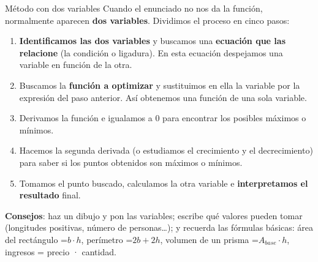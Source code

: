 \documentclass[11pt,a4paper]{article}
\newcommand{\fmm}[1]{\setbox0=\hbox{$#1$}\ifdim\wd0>\linewidth\[#1\]\else\mbox{\box0}\fi}
\newcommand{\fmuline}[1]{\textbf{\color{fmaccent}#1}}
\begin{document}
  
\begin{fmdef}{Método con dos variables}
Cuando el enunciado no nos da la función, normalmente aparecen \textbf{dos variables}. Dividimos el proceso en cinco pasos:

      
\begin{enumerate}
\item \textbf{Identificamos las dos variables} y buscamos una \textbf{ecuación que las relacione} (la condición o ligadura). En esta ecuación despejamos una variable en función de la otra.
\item Buscamos la \textbf{función a optimizar} y sustituimos en ella la variable por la expresión del paso anterior. Así obtenemos una función de una sola variable.
\item Derivamos la función e igualamos a 0 para encontrar los posibles máximos o mínimos.
\item Hacemos la segunda derivada (o estudiamos el crecimiento y el decrecimiento) para saber si los puntos obtenidos son máximos o mínimos.
\item Tomamos el punto buscado, calculamos la otra variable e \textbf{interpretamos el resultado} final.
\end{enumerate}

      
\begin{fmnote}\fmuline{Consejos}: haz un dibujo y pon las variables; escribe qué valores pueden tomar (longitudes positivas, número de personas\dots{}); y recuerda las fórmulas básicas: área del rectángulo \fmm{b\cdot h}, perímetro \fmm{2b+2h}, volumen de un prisma \fmm{A_{base}\cdot h}, ingresos = precio · cantidad.\end{fmnote}
\end{fmdef}
\end{document}

